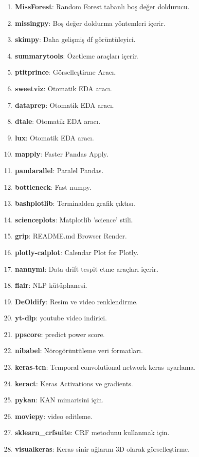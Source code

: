 \begin{enumerate}
    \item \textbf{MissForest}: Random Forest tabanlı boş değer doldurucu.
    \item \textbf{missingpy}: Boş değer doldurma yöntemleri içerir.
    \item \textbf{skimpy}: Daha gelişmiş df görüntüleyici.
    \item \textbf{summarytools}: Özetleme araçları içerir.
    \item \textbf{ptitprince}: Görselleştirme Aracı.
    \item \textbf{sweetviz}: Otomatik EDA aracı.
    \item \textbf{dataprep}: Otomatik EDA aracı.
    \item \textbf{dtale}: Otomatik EDA aracı.
    \item \textbf{lux}: Otomatik EDA aracı.
    \item \textbf{mapply}: Faster Pandas Apply.
    \item \textbf{pandarallel}: Paralel Pandas.
    \item \textbf{bottleneck}: Fast numpy.
    \item \textbf{bashplotlib}: Terminalden grafik çıktısı.
    \item \textbf{scienceplots}: Matplotlib 'science' stili.
    \item \textbf{grip}: README.md Browser Render.
    \item \textbf{plotly-calplot}: Calendar Plot for Plotly.
    \item \textbf{nannyml}: Data drift tespit etme araçları içerir.
    \item \textbf{flair}: NLP kütüphanesi.
    \item \textbf{DeOldify}: Resim ve video renklendirme.
    \item \textbf{yt-dlp}: youtube video indirici.
    \item \textbf{ppscore}: predict power score.
    \item \textbf{nibabel}: Nörogörüntüleme veri formatları.
    \item \textbf{keras-tcn}: Temporal convolutional network keras uyarlama.
    \item \textbf{keract}: Keras Activations ve gradients.
    \item \textbf{pykan}: KAN mimarisini için.
    \item \textbf{moviepy}: video editleme.
    \item \textbf{sklearn\_crfsuite}: CRF metodunu kullanmak için.
    \item \textbf{visualkeras}: Keras sinir ağlarını 3D olarak görselleştirme.
\end{enumerate}

\newpage